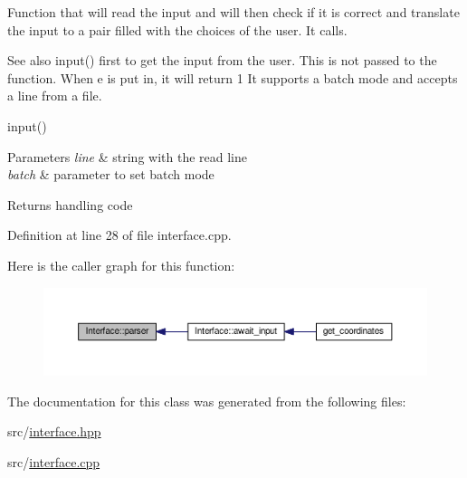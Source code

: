 Function that will read the input and will then check if it is correct and translate the input to a pair filled with the choices of the user. It calls. 

\begin{DoxySeeAlso}{See also}
input() first to get the input from the user. This is not passed to the function. When \textquotesingle{}e\textquotesingle{} is put in, it will return 1 It supports a batch mode and accepts a line from a file. 

input() 
\end{DoxySeeAlso}

\begin{DoxyParams}{Parameters}
{\em line} & string with the read line \\
\hline
{\em batch} & parameter to set batch mode \\
\hline
\end{DoxyParams}
\begin{DoxyReturn}{Returns}
handling code 
\end{DoxyReturn}


Definition at line 28 of file interface.\+cpp.



Here is the caller graph for this function\+:\nopagebreak
\begin{figure}[H]
\begin{center}
\leavevmode
\includegraphics[width=350pt]{class_interface_a345faa7570aa36a31681ca850d1c283d_icgraph}
\end{center}
\end{figure}




The documentation for this class was generated from the following files\+:\begin{DoxyCompactItemize}
\item 
src/\hyperlink{interface_8hpp}{interface.\+hpp}\item 
src/\hyperlink{interface_8cpp}{interface.\+cpp}\end{DoxyCompactItemize}
